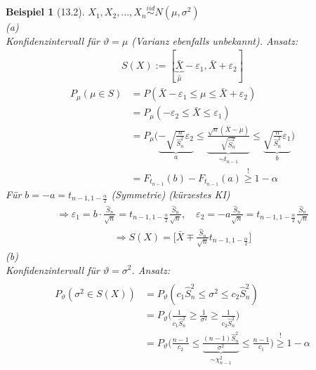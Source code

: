 \documentclass[a4paper,openany]{book}
\theoremstyle{mytheoremstyle}
\newtheorem*{bei}{Beispiel}
\theoremstyle{mytheoremstyle2}
\begin{document}
\begin{bei}[13.2]
  $X_1,X_2,...,X_n \overset{iid}\sim N(\mu ,\sigma ^2)$ \\
  (a)\\
  Konfidenzintervall für $\vartheta =\mu $ (Varianz ebenfalls unbekannt). Ansatz:%
  \begin{align*}
    S(X):=[\underbrace{\bar{X}}_{\hat{\mu }}-\varepsilon _1,\bar{X}+\varepsilon _2]
  \end{align*}
  \begin{align*}
    P _{\mu }(\mu \in S )
    &=P(\bar{X}-\varepsilon_1 \leq \mu \leq \bar{X}+\varepsilon_2 )\\
    &=P _{\mu }(-\varepsilon_2 \leq \bar{X}\leq \varepsilon_1 )\\
    &=P _{\mu }\bigg( \underbrace{-\sqrt{\frac{n}{\hat{S}_n^2}}\varepsilon_2}_{a}\leq \underbrace{\frac{\sqrt{n}(\bar{X}-\mu )}{\sqrt{\hat{S}_n^2}}}_{\sim t _{n-1}}\leq \underbrace{\sqrt{\frac{n}{\hat{S}_n^2}}\varepsilon_1}_{b}  \bigg)\\
    &=F _{t _{n-1}}(b)-F _{t _{n-1}}(a)\overset{!}\geq 1-\alpha 
  \end{align*}
  Für $b=-a=t _{n-1,1-\frac{\alpha }{2}}$ (Symmetrie) (kürzestes KI)
  \begin{align*}
    \Rightarrow \varepsilon _1=b \cdot \frac{\hat{S}_n}{\sqrt{n}}=t _{n-1,1-\frac{\alpha }{2}}\frac{\hat{S}_n}{\sqrt{n}},\quad \varepsilon _2=-a \frac{\hat{S}_n}{\sqrt{n}}=t _{n-1,1-\frac{\alpha }{2}}\frac{\hat{S}_n}{\sqrt{n}}
  \end{align*}
  \begin{align*}
    \Rightarrow S(X)=\bigg[\bar{X}\mp \frac{\hat{S}_n}{\sqrt{n}}t _{n-1,1-\frac{\alpha }{2}}\bigg]
  \end{align*}
  (b)\\
  Konfidenzintervall für $\vartheta =\sigma ^2$. Ansatz: 
  \begin{align*}
    [c_1 \hat{S}_n^2,c_2 \hat{S}_n^2]
  \end{align*}
  \begin{align*}
    P _{\vartheta }(\sigma ^2 \in S(X))
    &=P _{\vartheta }(c_1 \hat{S}_n^2 \leq \sigma ^2 \leq c_2 \hat{S}_n^2)\\
    &=P _{\vartheta }\bigg(\frac{1}{c_1 \hat{S}_n^2}\geq \frac{1}{\sigma ^2}\geq \frac{1}{c_2 \hat{S}_n^2}\bigg)\\
    &=P _{\vartheta }\bigg(\frac{n-1}{c_2}\leq \underbrace{\frac{(n-1)\hat{S}_n^2}{\sigma ^2}}_{\sim \chi _{n-1}^2}\leq \frac{n-1}{c_1}\bigg)\overset{!}\geq 1-\alpha 

\end{align*}
\end{bei}
\end{document}
